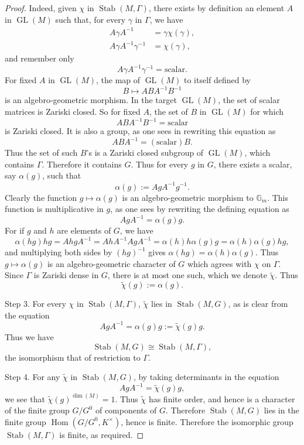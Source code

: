 \begin{proof}
Indeed, given \(\chi\) in \(\operatorname{Stab}(M,\Gamma)\), there exists by
definition an element \(A\) in \(\operatorname{GL}(M)\) such that, for every
\(\gamma\) in \(\Gamma\), we have
\[
\begin{aligned}
  A\gamma A^{-1}&=\gamma\chi(\gamma),\\
  A\gamma A^{-1}\gamma^{-1}&=\chi(\gamma),
\end{aligned}
\]
and remember only
\[
  A\gamma A^{-1}\gamma^{-1}=\text{scalar}.
\]
For fixed \(A\) in \(\operatorname{GL}(M)\), the map of
\(\operatorname{GL}(M)\) to itself defined by
\[
  B\mapsto ABA^{-1}B^{-1}
\]
is an algebro-geometric morphism. In the target \(\operatorname{GL}(M)\), the
set of scalar matrices is Zariski closed. So for fixed \(A\), the set of
\(B\) in \(\operatorname{GL}(M)\) for which
\[
  ABA^{-1}B^{-1}=\text{scalar}
\]
is Zariski closed. It is also a group, as one sees in rewriting this equation
as
\[
  ABA^{-1}=(\text{scalar})B.
\]
Thus the set of such \(B\)'s is a Zariski closed subgroup of
\(\operatorname{GL}(M)\), which contains \(\Gamma\). Therefore it contains
\(G\). Thus for every \(g\) in \(G\), there exists a scalar, say
\(\alpha(g)\), such that
\[
  \alpha(g):=AgA^{-1}g^{-1}.
\]
Clearly the function \(g\mapsto\alpha(g)\) is an algebro-geometric morphism to
\(\mathbb{G}_m\). This function is multiplicative in \(g\), as one sees by
rewriting the defining equation as
\[
  AgA^{-1}=\alpha(g)g.
\]
For if \(g\) and \(h\) are elements of \(G\), we have
\[
  \alpha(hg)hg=AhgA^{-1}=AhA^{-1}AgA^{-1}
  =\alpha(h)h\alpha(g)g=\alpha(h)\alpha(g)hg,
\]
and multiplying both sides by \((hg)^{-1}\) gives
\(\alpha(hg)=\alpha(h)\alpha(g)\). Thus \(g\mapsto\alpha(g)\) is an
algebro-geometric character of \(G\) which agrees with \(\chi\) on
\(\Gamma\). Since \(\Gamma\) is Zariski dense in \(G\), there is at most one
such, which we denote \(\widetilde{\chi}\). Thus
\[
  \widetilde{\chi}(g):=\alpha(g).
\]

Step 3. For every \(\chi\) in \(\operatorname{Stab}(M,\Gamma)\),
\(\widetilde{\chi}\) lies in \(\operatorname{Stab}(M,G)\), as is clear from
the equation
\[
  AgA^{-1}=\alpha(g)g:=\widetilde{\chi}(g)g.
\]
Thus we have
\[
  \operatorname{Stab}(M,G)\cong\operatorname{Stab}(M,\Gamma),
\]
the isomorphism that of restriction to \(\Gamma\).

Step 4. For any \(\widetilde{\chi}\) in \(\operatorname{Stab}(M,G)\), by
taking determinants in the equation
\[
  AgA^{-1}=\widetilde{\chi}(g)g,
\]
we see that \(\widetilde{\chi}(g)^{\dim(M)}=1\). Thus
\(\widetilde{\chi}\) has finite order, and hence is a character of the finite
group \(G/G^0\) of components of \(G\). Therefore
\(\operatorname{Stab}(M,G)\) lies in the finite group
\(\operatorname{Hom}(G/G^0,K^\times)\), hence is finite. Therefore the
isomorphic group \(\operatorname{Stab}(M,\Gamma)\) is finite, as required.
\end{proof}
